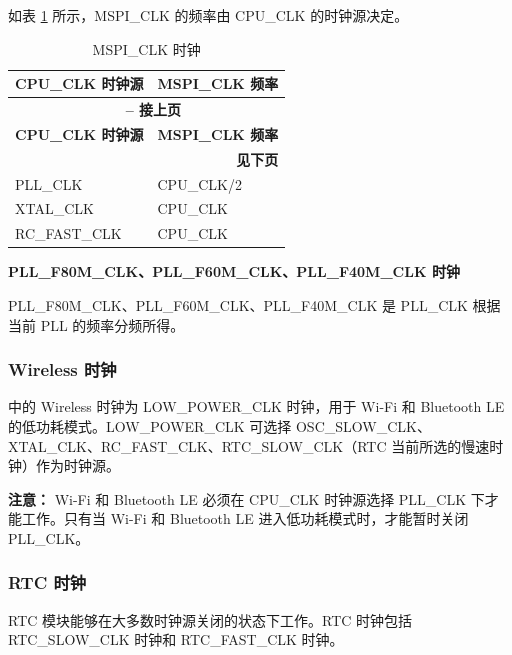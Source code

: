 \documentclass[main\_\_CN.tex]{subfiles}
\begin{document}
如表 \ref{table:mspi_clk_src} 所示，MSPI\_CLK 的频率由 CPU\_CLK 的时钟源决定。

 \begin{longtable}[c]{ |p{5cm}|p{5cm}| }
      \caption{MSPI\_CLK 时钟}
    \label{table:mspi_clk_src} \\
        \hline
    \rowcolor{lightgray}
        \textbf{CPU\_CLK 时钟源} & \textbf{MSPI\_CLK 频率} \\
        \hline
        \endfirsthead
        \multicolumn{2}{c}{\bfseries \tablename\ \thetable{} -- 接上页}\\\hline

    \rowcolor{lightgray}
        \textbf{CPU\_CLK 时钟源} & \textbf{MSPI\_CLK 频率} \\\hline
        \endhead
        \multicolumn{2}{r}{\textbf{见下页}} \\
        \endfoot
        \endlastfoot
        \hline
        PLL\_CLK & CPU\_CLK/2 \\
        \hline
        XTAL\_CLK & CPU\_CLK \\
        \hline
        RC\_FAST\_CLK & CPU\_CLK \\
        \hline
\end{longtable}

\textbf{PLL\_F80M\_CLK、PLL\_F60M\_CLK、PLL\_F40M\_CLK 时钟}

PLL\_F80M\_CLK、PLL\_F60M\_CLK、PLL\_F40M\_CLK 是 PLL\_CLK 根据当前 PLL 的频率分频所得。




\subsubsection{Wireless 时钟}

\chipname{} 中的 Wireless 时钟为 LOW\_POWER\_CLK 时钟，用于 Wi-Fi 和 Bluetooth LE 的低功耗模式。LOW\_POWER\_CLK 可选择 OSC\_SLOW\_CLK、XTAL\_CLK、RC\_FAST\_CLK、RTC\_SLOW\_CLK（RTC 当前所选的慢速时钟）作为时钟源。

\textbf{注意：} Wi-Fi 和 Bluetooth LE 必须在 CPU\_CLK 时钟源选择 PLL\_CLK 下才能工作。只有当 Wi-Fi 和 Bluetooth LE 进入低功耗模式时，才能暂时关闭 PLL\_CLK。



\subsubsection{RTC 时钟}

RTC 模块能够在大多数时钟源关闭的状态下工作。RTC 时钟包括 RTC\_SLOW\_CLK 时钟和 RTC\_FAST\_CLK 时钟。
\end{document}
